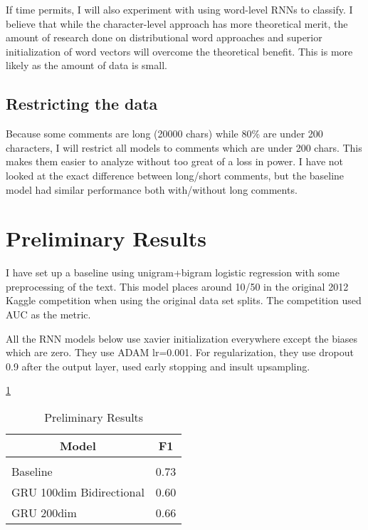\documentclass{article} %
\begin{document}
If time permits, I will also experiment with using word-level RNNs to classify. I believe that while the character-level approach has more theoretical merit, the amount of research done on distributional word approaches and superior initialization of word vectors will overcome the theoretical benefit. This is more likely as the amount of data is small. 

\subsection{Restricting the data}
Because some comments are long (20000 chars) while 80\% are under 200 characters, I will restrict all models to comments which are under 200 chars. This makes them easier to analyze without too great of a loss in power. I have not looked at the exact difference between long/short comments, but the baseline model had similar performance both with/without long comments. 

\section{Preliminary Results}
I have set up a baseline using unigram+bigram logistic regression with some preprocessing of the text. This model places around 10/50 in the original 2012 Kaggle competition when using the original data set splits. The competition used AUC as the metric. 

All the RNN models below use xavier initialization everywhere except the biases which are zero. They use ADAM lr=0.001. For regularization, they use dropout 0.9 after the output layer, used early stopping and insult upsampling. 

\ref{preliminary-results}

\begin{table}[t]
\caption{Preliminary Results}
\label{preliminary-results}
\begin{center}
\begin{tabular}{ll}
\multicolumn{1}{c}{\bf Model}  &\multicolumn{1}{c}{\bf F1}
\\ \hline \\
Baseline        	&0.73 \\
GRU 100dim Bidirectional				&0.60 \\
GRU 200dim				&0.66 \\
\end{tabular}
\end{center}
\end{table}
\end{document}
